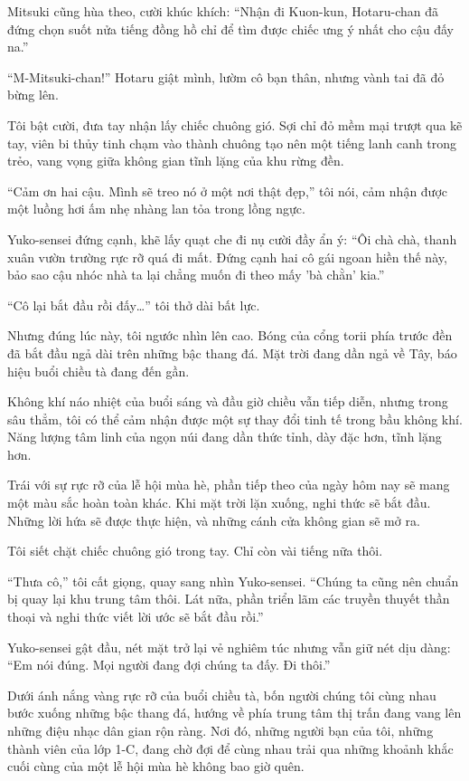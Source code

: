 \documentclass[../main.tex]{subfiles}
\begin{document}
Mitsuki cũng hùa theo, cười khúc khích: ``Nhận đi Kuon-kun, Hotaru-chan đã đứng chọn suốt nửa tiếng đồng hồ chỉ để tìm được chiếc ưng ý nhất cho cậu đấy na.''

``M-Mitsuki-chan!'' Hotaru giật mình, lườm cô bạn thân, nhưng vành tai đã đỏ bừng lên.

Tôi bật cười, đưa tay nhận lấy chiếc chuông gió. Sợi chỉ đỏ mềm mại trượt qua kẽ tay, viên bi thủy tinh chạm vào thành chuông tạo nên một tiếng lanh canh trong trẻo, vang vọng giữa không gian tĩnh lặng của khu rừng đền.

``Cảm ơn hai cậu. Mình sẽ treo nó ở một nơi thật đẹp,'' tôi nói, cảm nhận được một luồng hơi ấm nhẹ nhàng lan tỏa trong lồng ngực.

Yuko-sensei đứng cạnh, khẽ lấy quạt che đi nụ cười đầy ẩn ý: ``Ôi chà chà, thanh xuân vườn trường rực rỡ quá đi mất. Đứng cạnh hai cô gái ngoan hiền thế này, bảo sao cậu nhóc nhà ta lại chẳng muốn đi theo mấy 'bà chằn' kia.''

``Cô lại bắt đầu rồi đấy\dots'' tôi thở dài bất lực.

Nhưng đúng lúc này, tôi ngước nhìn lên cao. Bóng của cổng torii phía trước đền đã bắt đầu ngả dài trên những bậc thang đá. Mặt trời đang dần ngả về Tây, báo hiệu buổi chiều tà đang đến gần.

Không khí náo nhiệt của buổi sáng và đầu giờ chiều vẫn tiếp diễn, nhưng trong sâu thẳm, tôi có thể cảm nhận được một sự thay đổi tinh tế trong bầu không khí. Năng lượng tâm linh của ngọn núi đang dần thức tỉnh, dày đặc hơn, tĩnh lặng hơn.

Trái với sự rực rỡ của lễ hội mùa hè, phần tiếp theo của ngày hôm nay sẽ mang một màu sắc hoàn toàn khác. Khi mặt trời lặn xuống, nghi thức sẽ bắt đầu. Những lời hứa sẽ được thực hiện, và những cánh cửa không gian sẽ mở ra.

Tôi siết chặt chiếc chuông gió trong tay. Chỉ còn vài tiếng nữa thôi.

``Thưa cô,'' tôi cất giọng, quay sang nhìn Yuko-sensei. ``Chúng ta cũng nên chuẩn bị quay lại khu trung tâm thôi. Lát nữa, phần triển lãm các truyền thuyết thần thoại và nghi thức viết lời ước sẽ bắt đầu rồi.''

Yuko-sensei gật đầu, nét mặt trở lại vẻ nghiêm túc nhưng vẫn giữ nét dịu dàng: ``Em nói đúng. Mọi người đang đợi chúng ta đấy. Đi thôi.''

Dưới ánh nắng vàng rực rỡ của buổi chiều tà, bốn người chúng tôi cùng nhau bước xuống những bậc thang đá, hướng về phía trung tâm thị trấn đang vang lên những điệu nhạc dân gian rộn ràng. Nơi đó, những người bạn của tôi, những thành viên của lớp 1-C, đang chờ đợi để cùng nhau trải qua những khoảnh khắc cuối cùng của một lễ hội mùa hè không bao giờ quên.
\end{document}
